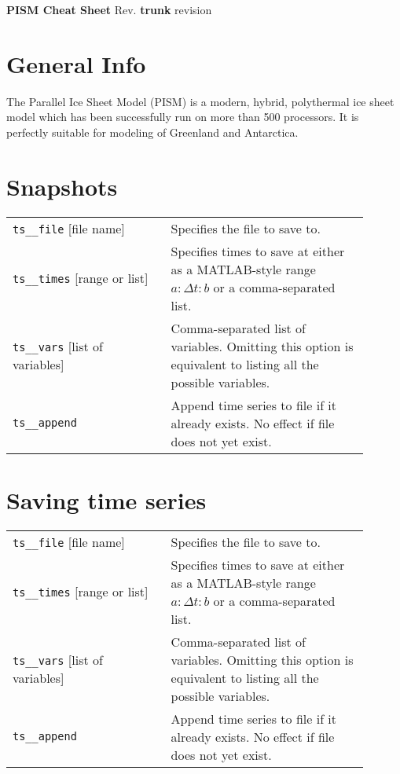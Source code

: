 \documentclass[10pt,landscape]{article}
\newcommand{\PISMREV}{\textbf{trunk} revision }
\newcommand{\und}{\_\!\_}
\begin{document}
\begin{center}
     \Large{\textbf{PISM Cheat Sheet} Rev. \PISMREV} \\
\end{center}


\begin{multicols*}{3}


\setlength{\columnseprule}{0.25pt}
\setlength{\premulticols}{1pt}
\setlength{\postmulticols}{1pt}
\setlength{\multicolsep}{1pt}
\setlength{\columnsep}{2pt}

\section{General Info}

The Parallel Ice Sheet Model (PISM) is a modern, hybrid, polythermal
ice sheet model which has been successfully run on more than 500
processors. It is perfectly suitable for modeling of Greenland and Antarctica.


\section{Snapshots}

\begin{tabular}{@{}p{0.4\linewidth}p{0.5\linewidth}@{}}
  \texttt{ts\und file} [file name] & Specifies the file to save to.\\
  \texttt{ts\und times} [range or list] & Specifies times to save at either as a MATLAB-style range $a:\Delta t:b$ or a comma-separated list. \\
  \texttt{ts\und vars} [list of variables] & Comma-separated list of variables. Omitting this option is equivalent to listing all the possible variables.\\
  \texttt{ts\und append} & Append time series to file if it already exists.  No effect if file does not yet exist.
\end{tabular}


\section{Saving time series}

\begin{tabular}{@{}p{0.4\linewidth}p{0.5\linewidth}@{}}
  \texttt{ts\und file} [file name] & Specifies the file to save to.\\
  \texttt{ts\und times} [range or list] & Specifies times to save at either as a MATLAB-style range $a:\Delta t:b$ or a comma-separated list. \\
  \texttt{ts\und vars} [list of variables] & Comma-separated list of variables. Omitting this option is equivalent to listing all the possible variables.\\
  \texttt{ts\und append} & Append time series to file if it already exists.  No effect if file does not yet exist. \\
\end{tabular}




\end{multicols*}
\end{document}
